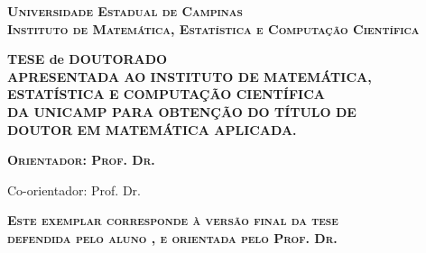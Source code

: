 \begin{center}
    {\Large \scshape \bfseries Universidade Estadual de Campinas \\
    Instituto de Matem\'atica, Estat\'istica e Computa\c c\~ao
    Cient\'ifica}
\end{center}
\vspace{1cm}
\begin{center}
    {\Large \scshape \bfseries \autor}
\end{center}
\vspace{1cm}
\begin{center}
    {\Large \scshape \bfseries \titulo}
\end{center}
\vspace{2cm}
\begin{flushright}
    \begin{minipage}[c]{.6\textwidth}
        \begin{flushright}
            {\small \bfseries
            TESE de DOUTORADO \\%
            APRESENTADA AO INSTITUTO DE MATEMÁTICA,\\
            ESTATÍSTICA E COMPUTAÇÃO CIENTÍFICA\\
            DA UNICAMP PARA OBTENÇÃO DO TÍTULO DE \\ 
            DOUTOR %
            EM
            MATEM\'ATICA APLICADA.
            }
        \end{flushright}
    \end{minipage}
\end{flushright}
\vspace{1cm}
\begin{center}
    {\Large \scshape \bfseries
    Orientador: Prof. Dr. \orientador

    Co-orientador: Prof. Dr. \coorientador
    }
\end{center}
\vspace{2cm}
\noindent
{\footnotesize \scshape \bfseries
Este exemplar corresponde \`a vers\~ao final da 
tese \\  %
defendida pelo aluno \autor, e orientada pelo Prof. Dr. \orientador
}
\vspace{1cm}

